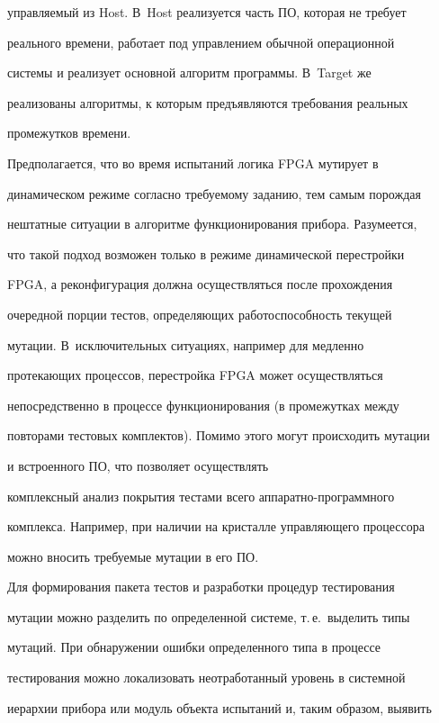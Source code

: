 управляемый из Host. В~Host реализуется часть ПО, которая не требует


реального времени, работает под управлением обычной операционной


системы и реализует основной алгоритм программы. В~Target же


реализованы алгоритмы, к которым предъявляются требования реальных


промежутков времени.





    Предполагается, что во время испытаний логика FPGA мутирует в


динамическом режиме согласно требуемому заданию, тем самым порождая


нештатные ситуации в алгоритме функционирования прибора. Разумеется,


что такой подход возможен только в режиме динамической перестройки


FPGA, а реконфигурация должна осуществляться после прохождения


очередной порции тестов, определяющих работоспособность текущей


мутации. В~исключительных ситуациях, например для медленно


протекающих процессов, перестройка FPGA может осуществляться


непосредственно в процессе функционирования (в промежутках между


повторами тестовых комплектов). Помимо этого могут происходить мутации


и встроенного ПО, что позволяет осуществлять


комплексный анализ покрытия тестами всего аппаратно-программного


комплекса. Например, при наличии на кристалле управляющего процессора


можно вносить требуемые мутации в его ПО.





    Для формирования пакета тестов и разработки процедур тестирования


мутации можно разделить по определенной системе, т.\,е.\ выделить типы


мутаций. При обнаружении ошибки определенного типа в процессе


тестирования можно локализовать неотработанный уровень в системной


иерархии прибора или модуль объекта испытаний и, таким образом, выявить


